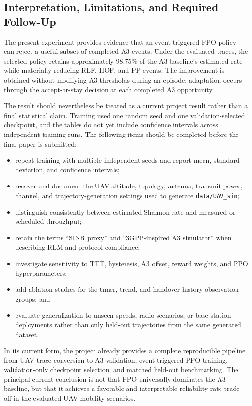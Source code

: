 \subsection{Interpretation, Limitations, and Required Follow-Up}
\label{subsec:limitations}

The present experiment provides evidence that an event-triggered PPO policy can
reject a useful subset of completed A3 events. Under the evaluated traces, the
selected policy retains approximately 98.75\% of the A3 baseline's estimated
rate while materially reducing RLF, HOF, and PP events. The improvement is
obtained without modifying A3 thresholds during an episode; adaptation occurs
through the accept-or-stay decision at each completed A3 opportunity.

The result should nevertheless be treated as a current project result rather
than a final statistical claim. Training used one random seed and one
validation-selected checkpoint, and the tables do not yet include confidence
intervals across independent training runs. The following items should be
completed before the final paper is submitted:

\begin{itemize}
    \item repeat training with multiple independent seeds and report mean,
    standard deviation, and confidence intervals;
    \item recover and document the UAV altitude, topology, antenna, transmit
    power, channel, and trajectory-generation settings used to generate
    \texttt{data/UAV\_sim};
    \item distinguish consistently between estimated Shannon rate and measured
    or scheduled throughput;
    \item retain the terms ``SINR proxy'' and ``3GPP-inspired A3 simulator''
    when describing RLM and protocol compliance;
    \item investigate sensitivity to TTT, hysteresis, A3 offset, reward weights,
    and PPO hyperparameters;
    \item add ablation studies for the timer, trend, and handover-history
    observation groups; and
    \item evaluate generalization to unseen speeds, radio scenarios, or base
    station deployments rather than only held-out trajectories from the same
    generated dataset.
\end{itemize}

In its current form, the project already provides a complete reproducible
pipeline from UAV trace conversion to A3 validation, event-triggered PPO
training, validation-only checkpoint selection, and matched held-out
benchmarking. The principal current conclusion is not that PPO universally
dominates the A3 baseline, but that it achieves a favorable and interpretable
reliability-rate trade-off in the evaluated UAV mobility scenarios.
